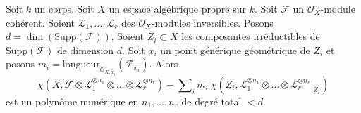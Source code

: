 \begin{lemma}
\label{lemma-numerical-polynomial-leading-term}
Soit $k$ un corps. Soit $X$ un espace algébrique propre sur $k$. Soit
$\mathcal{F}$ un $\mathcal{O}_X$-module cohérent. Soient
$\mathcal{L}_1, \ldots, \mathcal{L}_r$ des $\mathcal{O}_X$-modules inversibles.
Posons $d = \dim(\text{Supp}(\mathcal{F}))$.
Soient $Z_i \subset X$ les composantes irréductibles
de $\text{Supp}(\mathcal{F})$ de dimension $d$. Soit $\overline{x}_i$
un point générique géométrique de $Z_i$ et posons
$m_i = \text{longueur}_{\mathcal{O}_{X, \overline{x}_i}}
(\mathcal{F}_{\overline{x}_i})$.
Alors
$$
\chi(X, \mathcal{F} \otimes \mathcal{L}_1^{\otimes n_1} \otimes \ldots \otimes
\mathcal{L}_r^{\otimes n_r}) -
\sum\nolimits_i
m_i\ \chi(Z_i, \mathcal{L}_1^{\otimes n_1} \otimes \ldots \otimes
\mathcal{L}_r^{\otimes n_r}|_{Z_i})
$$
est un polynôme numérique en $n_1, \ldots, n_r$ de degré total $< d$.
\end{lemma}

